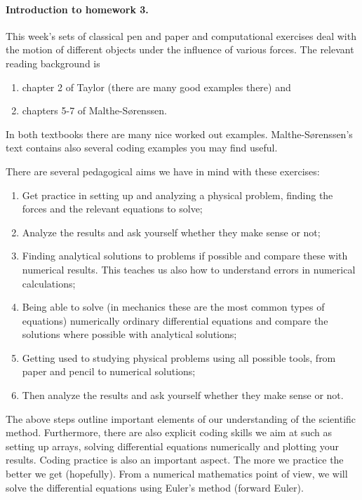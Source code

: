 \documentclass[%
oneside,                 %
final,                   %
10pt]{article}
\begin{document}
\noindent
\paragraph{Introduction to homework 3.}
This week's sets of classical pen and paper and computational
exercises deal with the motion of different objects under the
influence of various forces. The relevant reading background is
\begin{enumerate}
\item chapter 2 of Taylor (there are many good examples there) and

\item chapters 5-7 of Malthe-Sørenssen.
\end{enumerate}

\noindent
In both textbooks there are many nice worked out examples. Malthe-Sørenssen's text contains also several coding examples you may find useful. 

There are several pedagogical aims we have in mind with these exercises:
\begin{enumerate}
\item Get practice in setting up and analyzing a physical problem, finding the forces and the relevant equations to solve;

\item Analyze the results and ask yourself whether they make sense or not;

\item Finding analytical solutions to problems if possible and compare these with numerical results. This teaches us also how to understand errors in numerical calculations;

\item Being able to solve (in mechanics these are the most common types of equations) numerically ordinary differential equations and compare the solutions where possible with analytical solutions;

\item Getting used to studying physical problems using all possible tools, from paper and pencil to numerical solutions;

\item Then analyze the results and ask yourself whether they make sense or not.
\end{enumerate}

\noindent
The above steps outline important elements of our understanding of the
scientific method. Furthermore, there are also explicit coding skills
we aim at such as setting up arrays, solving differential equations
numerically and plotting your results.  Coding practice is also an
important aspect. The more we practice the better we get (hopefully).
From a numerical mathematics point of view, we will solve the differential
equations using Euler's method (forward Euler).
\end{document}
